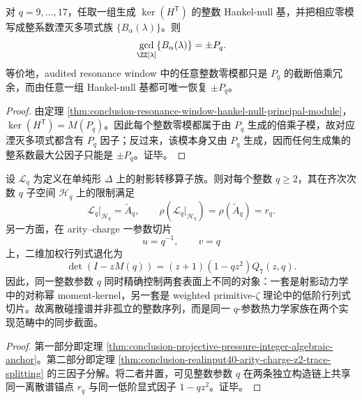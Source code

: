\begin{corollary}\label{cor:conclusion-resonance-window-hankel-null-gcd-recovery}
对 \(q=9,\dots,17\)，任取一组生成 \(\ker(H^{\mathsf T})\) 的整数 Hankel-null 基，并把相应零模写成整系数湮灭多项式族 \(\{B_\alpha(\lambda)\}\)。则
\[
\gcd_{\ZZ[\lambda]}\{B_\alpha(\lambda)\}=\pm P_q.
\]
等价地，audited resonance window 中的任意整数零模都只是 \(P_q\) 的截断倍乘冗余，而由任意一组 Hankel-null 基都可唯一恢复 \(\pm P_q\)。
\end{corollary}
\begin{proof}
由定理 \ref{thm:conclusion-resonance-window-hankel-null-principal-module}，\(\ker(H^{\mathsf T})=M(P_q)\)。因此每个整数零模都属于由 \(P_q\) 生成的倍乘子模，故对应湮灭多项式都含有 \(P_q\) 因子；反过来，该模本身又由 \(P_q\) 生成，因而任何生成集的整系数最大公因子只能是 \(\pm P_q\)。证毕。
\end{proof}

\begin{theorem}[离散碰撞谱的双实现统一]\label{thm:conclusion-collision-spectrum-dual-realization-unification}
设 \(\mathcal L_q\) 为定义在单纯形 \(\Delta\) 上的射影转移算子族。则对每个整数 \(q\ge 2\)，其在齐次次数 \(q\) 子空间 \(\mathcal H_q\) 上的限制满足
\[
\mathcal L_q|_{\mathcal H_q}=\widetilde A_q,
\qquad
\rho(\mathcal L_q|_{\mathcal H_q})=\rho(\widetilde A_q)=r_q.
\]
另一方面，在 arity--charge 一参数切片
\[
u=q^{-1},
\qquad
v=q
\]
上，二维加权行列式退化为
\[
\det(I-zM(q))=(z+1)(1-qz^2)Q_7(z,q).
\]
因此，同一整数参数 \(q\) 同时精确控制两套表面上不同的对象：一套是射影动力学中的对称幂 moment-kernel，另一套是 weighted primitive-\(\zeta\) 理论中的低阶行列式切片。故离散碰撞谱并非孤立的整数序列，而是同一 \(q\)-参数热力学家族在两个实现范畴中的同步截面。
\end{theorem}
\begin{proof}
第一部分即定理 \ref{thm:conclusion-projective-pressure-integer-algebraic-anchor}。第二部分即定理 \ref{thm:conclusion-realinput40-arity-charge-z2-trace-splitting} 的三因子分解。将二者并置，可见整数参数 \(q\) 在两条独立构造链上共享同一离散谱锚点 \(r_q\) 与同一低阶显式因子 \(1-qz^2\)。证毕。
\end{proof}

